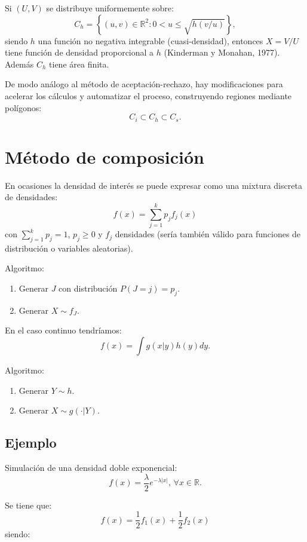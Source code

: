 \documentclass[]{book}
\theoremstyle{definition}
\theoremstyle{definition}
\theoremstyle{definition}
\theoremstyle{remark}
\begin{document}
Si \((U,V)\) se distribuye uniformemente sobre:
\[C_{h} = \left\{ \left( u,v\right) \in \mathbb{R}^{2} : 
0<u\leq \sqrt{h(v/u)} \right\},\] siendo \(h\) una función no negativa
integrable (cuasi-densidad), entonces \(X=V/U\) tiene función de
densidad proporcional a \(h\) (Kinderman y Monahan, 1977). Además
\(C_{h}\) tiene área finita.

De modo análogo al método de aceptación-rechazo, hay modificaciones para
acelerar los cálculos y automatizar el proceso, construyendo regiones
mediante polígonos:\[C_{i}\subset C_{h}\subset C_{s}.\]

\section{Método de composición}\label{metodo-de-composicion}

En ocasiones la densidad de interés se puede expresar como una mixtura
discreta de densidades: \[f(x)=\sum_{j=1}^{k}p_{j}f_{j}(x)\] con
\(\sum_{j=1}^{k}p_{j}=1\), \(p_{j}\geq 0\) y \(f_{j}\) densidades (sería
también válido para funciones de distribución o variables aleatorias).

Algoritmo:

\begin{enumerate}
\def\labelenumi{\arabic{enumi}.}
\item
  Generar \(J\) con distribución \(P\left(  J=j\right) =p_{j}\).
\item
  Generar \(X\sim f_{J}\).
\end{enumerate}

En el caso continuo tendríamos: \[f(x)=\int g(x|y)h(y)dy.\]

Algoritmo:

\begin{enumerate}
\def\labelenumi{\arabic{enumi}.}
\item
  Generar \(Y\sim h\).
\item
  Generar \(X\sim g(\cdot |Y)\).
\end{enumerate}

\subsection{Ejemplo}\label{ejemplo-2}

Simulación de una densidad doble exponencial:
\[f\left( x\right) =\frac{\lambda }{2}e^{-\lambda \left\vert x\right\vert }%
\text{, }\forall x\in \mathbb{R}.\]

Se tiene que:
\[f\left( x\right) =\frac{1}{2}f_{1}\left( x\right) +\frac{1}{2}f_{2}\left(
x\right)\] siendo:
\end{document}
